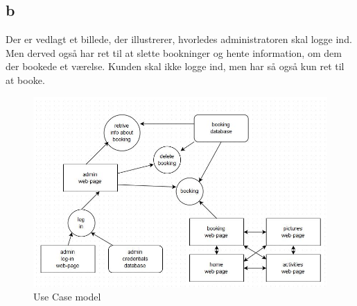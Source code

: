 \documentclass[12pt,a4paper]{article}
\begin{document}
\subsection{b}
Der er vedlagt et billede, der illustrerer, hvorledes administratoren skal logge ind. Men derved også har ret til at slette bookninger og hente information, om dem der bookede et værelse. Kunden skal ikke logge ind, men har så også kun ret til at booke.\\ 
\begin{figure}[H]
\includegraphics[scale=0.7]{useCaseModel.jpg}
\caption{Use Case model}
\end{figure}
\end{document}
